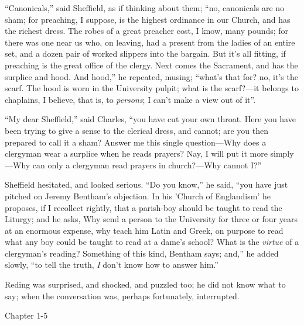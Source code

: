 ``Canonicals,'' said Sheffield, as if thinking about them;
``no, canonicals are no sham; for preaching, I suppose, is the
highest ordinance in our Church, and has the richest dress. The robes
of a great preacher cost, I know, many pounds; for there was one near
us who, on leaving, had a present from the ladies of an entire set,
and a dozen pair of worked slippers into the bargain. But it's all
fitting, if preaching is the great office of the clergy. Next comes
the Sacrament, and has the surplice and hood. And hood,'' he
repeated, musing; ``what's that for? no, it's the scarf. The hood
is worn in the University pulpit; what is the scarf?—it belongs to
chaplains, I believe, that is, to \emph{persons}; I can't make a view
out of it''.

``My dear Sheffield,'' said Charles, ``you have cut
your own throat. Here you have been trying to give a sense to the
clerical dress, and cannot; are you then prepared to call it a sham?
Answer me this single question—Why does a clergyman wear a surplice
when he reads prayers? Nay, I will put it more simply—Why can only a
clergyman read prayers in church?—Why cannot I?''

Sheffield hesitated, and looked serious. ``Do you know,''
he said, ``you have just pitched on Jeremy Bentham's objection. In
his 'Church of Englandism' he proposes, if I recollect rightly, that a
parish-boy should be taught to read the Liturgy; and he asks, Why send
a person to the University for three or four years at an enormous
expense, why teach him Latin and Greek, on purpose to read what any
boy could be taught to read at a dame's school? What is the \emph{virtue}
of a clergyman's reading? Something of this kind, Bentham says;
and,'' he added slowly, ``to tell the truth, \emph{I} don't know how
to answer him.''

Reding was surprised, and shocked, and puzzled too; he did not know
what to say; when the conversation was, perhaps fortunately,
interrupted.

Chapter 1-5


